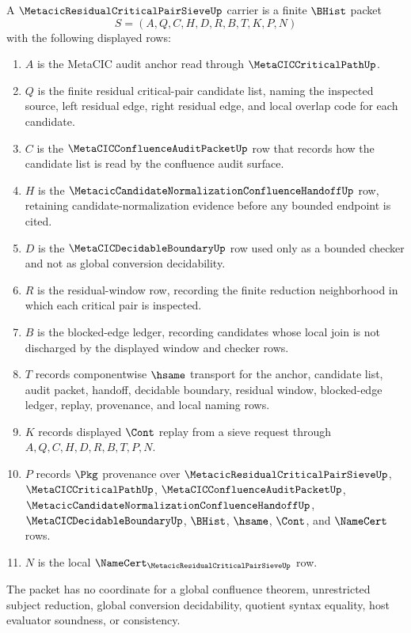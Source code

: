 \begin{definition}
\label{def:metacic-residual-critical-pair-sieve-carrier}
A $\MetacicResidualCriticalPairSieveUp$ carrier is a finite $\BHist$ packet
$$
S=(A,Q,C,H,D,R,B,T,K,P,N)
$$
with the following displayed rows:
\begin{enumerate}
\item $A$ is the MetaCIC audit anchor read through $\MetaCICCriticalPathUp$.
\item $Q$ is the finite residual critical-pair candidate list, naming the inspected source, left residual edge, right residual edge, and local overlap code for each candidate.
\item $C$ is the $\MetaCICConfluenceAuditPacketUp$ row that records how the candidate list is read by the confluence audit surface.
\item $H$ is the $\MetacicCandidateNormalizationConfluenceHandoffUp$ row, retaining candidate-normalization evidence before any bounded endpoint is cited.
\item $D$ is the $\MetaCICDecidableBoundaryUp$ row used only as a bounded checker and not as global conversion decidability.
\item $R$ is the residual-window row, recording the finite reduction neighborhood in which each critical pair is inspected.
\item $B$ is the blocked-edge ledger, recording candidates whose local join is not discharged by the displayed window and checker rows.
\item $T$ records componentwise $\hsame$ transport for the anchor, candidate list, audit packet, handoff, decidable boundary, residual window, blocked-edge ledger, replay, provenance, and local naming rows.
\item $K$ records displayed $\Cont$ replay from a sieve request through $A,Q,C,H,D,R,B,T,P,N$.
\item $P$ records $\Pkg$ provenance over $\MetacicResidualCriticalPairSieveUp$, $\MetaCICCriticalPathUp$, $\MetaCICConfluenceAuditPacketUp$, $\MetacicCandidateNormalizationConfluenceHandoffUp$, $\MetaCICDecidableBoundaryUp$, $\BHist$, $\hsame$, $\Cont$, and $\NameCert$ rows.
\item $N$ is the local $\NameCert_{\MetacicResidualCriticalPairSieveUp}$ row.
\end{enumerate}
The packet has no coordinate for a global confluence theorem, unrestricted subject reduction, global conversion decidability, quotient syntax equality, host evaluator soundness, or consistency.
\end{definition}

